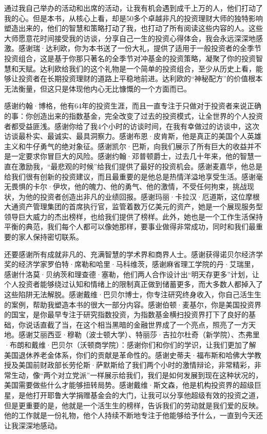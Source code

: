 通过我自己举办的活动和出席的活动，让我有机会遇到成千上万的人，他们打动了我的心。但是本书，从核心上看，却是50多个卓越非凡的投资理财大师的独特影响塑造出来的，他们的智慧和策略打动了我，也打动了所有阅读这些内容的人。这些大师愿意花时间接受我的访谈，分享自己一生的投资心得体会，我会永远深深地感激。感谢瑞·达利欧，你为本书送了一份大礼，提供了适用于一般投资者的全季节投资组合，这是基于你那只著名的全季节对冲基金的投资策略，凝聚了你的投资智慧和天赋。达利欧给我们的这个礼物是一个简单的投资组合，至少从历史上看，能够让投资者在长期投资理财的道路上平稳地前进。达利欧的“神秘配方”的价值根本无法衡量，但这只是体现他内心无比慷慨的一个方面而已。

感谢约翰·博格，他有64年的投资生涯，而且一直专注于只做对于投资者来说正确的事：你创造出来的指数基金，完全改变了过去的投资模式，让全世界的个人投资者都受益匪浅。感谢你给了我4个小时的访谈时间，在我有幸做过的访谈中，这次访谈最朴实、最诚实、最具洞察力。感谢布恩·皮肯斯，他是真正的美国个人英雄主义和牛仔勇气的绝对象征。感谢凯尔·巴斯，向我们展示了所有巨大的收益并不是一定要求你冒巨大的风险。感谢约翰·邓普顿爵士，过去几十年来，他的智慧一直在激励我，“最悲观的时候”给我们提供了最好的投资机会。感谢麦嘉华，他总是给我们很有创新的投资建议，而且最重要的是他总是热情洋溢地享受生活。感谢毫无畏惧的卡尔·伊坎，他的魄力、他的勇气、他的激情，不受任何拘束，挑战现状，为他的投资者创造出非凡的业绩回报。感谢玛丽·卡拉汉·厄道斯，这位摩根大通资产管理集团的首席执行官，监管着数万亿美元的资产，她是一个展现服务型领导巨大威力的杰出榜样，也给我们提供了榜样。此外，她也是一个工作生活保持平衡的典范，我们每个人都可以像她那样，要事业做得非常成功，同时和我们最重要的家人保持密切联系。

还要感谢所有成就非凡的、充满智慧的学术界和商界人士。感谢获得诺贝尔经济学奖的经济学家罗伯特·席勒和哈里·马科维茨，感谢麻省理工学院的丹·艾瑞里，感谢什洛莫·贝纳茨和理查德·塞勒，他们两人合作设计出“明天存更多”计划，让个人投资者能够绕过认知和情绪上的限制真正做到储蓄更多，而大多数人都掉入了这些陷阱无法解脱。感谢戴维·巴贝尔博士，你专注研究终身收入，你自己活生生的案例，帮助我塑造本书的很大一部分内容。感谢伯顿·麦基尔，你是美国投资界的国宝，是你最早专注于研究指数投资，为指数基金横扫投资界打下了良好的基础，你说话直截了当，在这个相当黑暗的金融世界成了一个亮点，照亮了一方天地。感谢艾丽西亚·穆勒（波士顿大学）、特丽莎·吉拉尔杜奇（新学院）、杰弗里·布朗和戴维·巴贝尔（沃顿商学院）：感谢你们和你们的学识，让我们更加了解美国退休养老金体系，你们的贡献是革命性的。感谢史蒂夫·福布斯和哈佛大学教授及美国前财政部长劳伦斯·萨默斯给了我们两个小时的激情辩论，非常精彩，非常生动，像“两个对立党派”一样展示给我们，我们是如何发展到现在这种状况的，美国需要做些什么才能够扭转局势。感谢戴维·斯文森，他是机构投资界的超级巨星，是他打开耶鲁大学捐赠基金会的大门，让我可以分享他超级有效的投资之道，但是更重要的是，他就是一个活生生的榜样，告诉我们的劳动就是我们爱的反映。他的工作就是一份礼物，他个人持续不断地专注于他能够给予什么，一直到今天还让我深深地感动。

